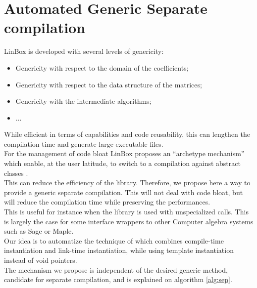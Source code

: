 \documentclass[runningheads,a4paper]{llncs}
\newcommand{\linbox}{{\sc LinBox}\xspace}
\begin{document}
\section{Automated Generic Separate compilation}
\linbox is developed with several levels of genericity:
\begin{itemize}
\item Genericity with respect to the domain of the coefficients;
\item Genericity with respect to the data structure of the matrices;
\item Genericity with the intermediate algorithms;
\item ...
\end{itemize}
While efficient in terms of capabilities and code reusability, this
can lengthen the compilation time and generate large executable files.\\
For the management of code bloat \linbox proposes an ``archetype
mechanism'' which enable, at the user latitude, to switch to a
compilation against abstract classes \cite[\S 2.1]{jgd:2002:icms}.\\
This can reduce the efficiency of the library. Therefore, we propose
here a way to provide a generic separate compilation. This will not
deal with code bloat, but will reduce the compilation time while
preserving the performances.\\
This is useful for instance when the library is used with
unspecialized calls. This is largely the case for some interface
wrappers to other Computer algebra systems such as {\sc Sage} or {\sc Maple}.\\
Our idea is to automatize the technique of
\cite{Erlingsson:1996:issac} which combines compile-time instantiation
and link-time instantiation, while using template instantiation
instead of void pointers.\\
The mechanism we propose is independent of the desired generic method,
candidate
for separate compilation, and is explained on algorithm \ref{alg:sep}.
\end{document}
